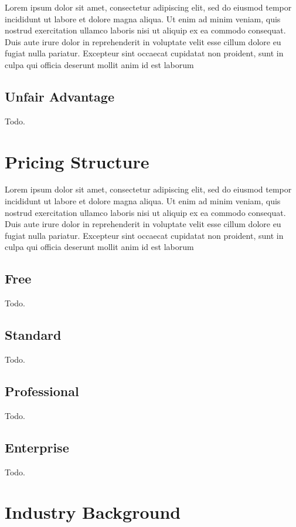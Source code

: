 Lorem ipsum dolor sit amet, consectetur adipiscing elit, sed do eiusmod tempor incididunt ut labore et dolore magna aliqua. Ut enim ad minim veniam, quis nostrud exercitation ullamco laboris nisi ut aliquip ex ea commodo consequat. Duis aute irure dolor in reprehenderit in voluptate velit esse cillum dolore eu fugiat nulla pariatur. Excepteur sint occaecat cupidatat non proident, sunt in culpa qui officia deserunt mollit anim id est laborum

\subsection{Unfair Advantage}

Todo.

\section{Pricing Structure}

Lorem ipsum dolor sit amet, consectetur adipiscing elit, sed do eiusmod tempor incididunt ut labore et dolore magna aliqua. Ut enim ad minim veniam, quis nostrud exercitation ullamco laboris nisi ut aliquip ex ea commodo consequat. Duis aute irure dolor in reprehenderit in voluptate velit esse cillum dolore eu fugiat nulla pariatur. Excepteur sint occaecat cupidatat non proident, sunt in culpa qui officia deserunt mollit anim id est laborum

\subsection{Free}

Todo.

\subsection{Standard}

Todo.

\subsection{Professional}

Todo.

\subsection{Enterprise}

Todo.

\section{Industry Background}

